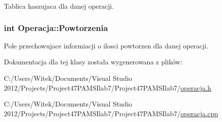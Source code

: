 Tablica haszujaca dla danej operacji. 

\hypertarget{class_operacja_aa568b17d05f31132b3d97eb5b7e93d61}{
\subsubsection[{Powtorzenia}]{\setlength{\rightskip}{0pt plus 5cm}int Operacja\-::\-Powtorzenia}}\label{class_operacja_aa568b17d05f31132b3d97eb5b7e93d61}


Pole przechowujace informiacji o ilosci powtorzen dla danej operacji. 



Dokumentacja dla tej klasy została wygenerowana z plików\-:\begin{DoxyCompactItemize}
\item 
C\-:/\-Users/\-Witek/\-Documents/\-Visual Studio 2012/\-Projects/\-Project47\-P\-A\-M\-S\-Ilab7/\-Project47\-P\-A\-M\-S\-Ilab7/\hyperlink{operacja_8h}{operacja.\-h}\item 
C\-:/\-Users/\-Witek/\-Documents/\-Visual Studio 2012/\-Projects/\-Project47\-P\-A\-M\-S\-Ilab7/\-Project47\-P\-A\-M\-S\-Ilab7/\hyperlink{operacja_8cpp}{operacja.\-cpp}\end{DoxyCompactItemize}
